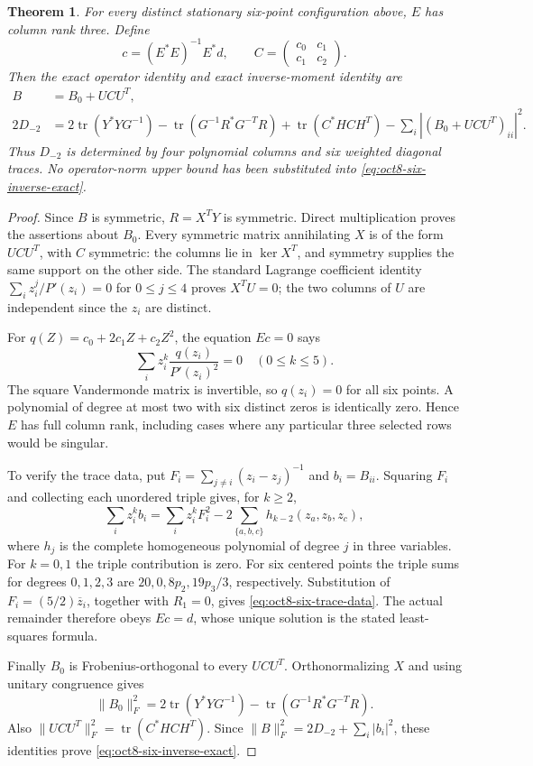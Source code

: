 \documentclass[11pt]{article}
\newtheorem{theorem}{Theorem}[section]
\theoremstyle{remark}
\numberwithin{equation}{section}
\begin{document}
\begin{theorem}\label{thm:oct8-six-trace-completion}
For every distinct stationary six-point configuration above, $E$ has
column rank three. Define
\[
 c=(E^*E)^{-1}E^*d,
 \qquad C=\begin{pmatrix}c_0&c_1\\c_1&c_2\end{pmatrix}.
\]
Then the exact operator identity and exact inverse-moment identity are
\begin{align}
 B&=B_0+UCU^T,\label{eq:oct8-six-B-exact}\\
 2D_{-2}
 &=2\operatorname{tr}(Y^*YG^{-1})
       -\operatorname{tr}(G^{-1}R^*G^{-T}R)
       +\operatorname{tr}(C^*HCH^T)
       -\sum_i|(B_0+UCU^T)_{ii}|^2.
       \label{eq:oct8-six-inverse-exact}
\end{align}
Thus $D_{-2}$ is determined by four polynomial columns and six weighted
diagonal traces. No operator-norm upper bound has been substituted into
\eqref{eq:oct8-six-inverse-exact}.
\end{theorem}
\begin{proof}
Since $B$ is symmetric, $R=X^TY$ is symmetric. Direct multiplication
proves the assertions about $B_0$. Every symmetric matrix annihilating
$X$ is of the form $UCU^T$, with $C$ symmetric: the columns lie in
$\ker X^T$, and symmetry supplies the same support on the other side.
The standard Lagrange coefficient identity
$\sum_i z_i^j/P'(z_i)=0$ for $0\le j\le4$ proves $X^TU=0$;
the two columns of $U$ are independent since the $z_i$ are distinct.

For $q(Z)=c_0+2c_1Z+c_2Z^2$, the equation $Ec=0$ says
\[
               \sum_i z_i^k\frac{q(z_i)}{P'(z_i)^2}=0
                         \quad(0\le k\le5).
\]
The square Vandermonde matrix is invertible, so $q(z_i)=0$ for all
six points. A polynomial of degree at most two with six distinct zeros
is identically zero. Hence $E$ has full column rank, including cases
where any particular three selected rows would be singular.

To verify the trace data, put $F_i=\sum_{j\ne i}(z_i-z_j)^{-1}$
and $b_i=B_{ii}$. Squaring $F_i$ and collecting each unordered triple
gives, for $k\ge2$,
\[
 \sum_i z_i^k b_i
   =\sum_i z_i^k F_i^2
     -2\sum_{\{a,b,c\}}h_{k-2}(z_a,z_b,z_c),
\]
where $h_j$ is the complete homogeneous polynomial of degree $j$ in
three variables. For $k=0,1$ the triple contribution is zero.
For six centered points the triple sums for degrees $0,1,2,3$ are
$20,0,8p_2,19p_3/3$, respectively. Substitution of
$F_i=(5/2)\overline z_i$, together with $R_1=0$, gives
\eqref{eq:oct8-six-trace-data}. The actual remainder therefore obeys
$Ec=d$, whose unique solution is the stated least-squares formula.

Finally $B_0$ is Frobenius-orthogonal to every $UCU^T$.
Orthonormalizing $X$ and using unitary congruence gives
\[
 \|B_0\|_F^2=2\operatorname{tr}(Y^*YG^{-1})
             -\operatorname{tr}(G^{-1}R^*G^{-T}R).
\]
Also $\|UCU^T\|_F^2=\operatorname{tr}(C^*HCH^T)$.
Since $\|B\|_F^2=2D_{-2}+\sum_i|b_i|^2$, these identities
prove \eqref{eq:oct8-six-inverse-exact}.
\end{proof}
\end{document}
